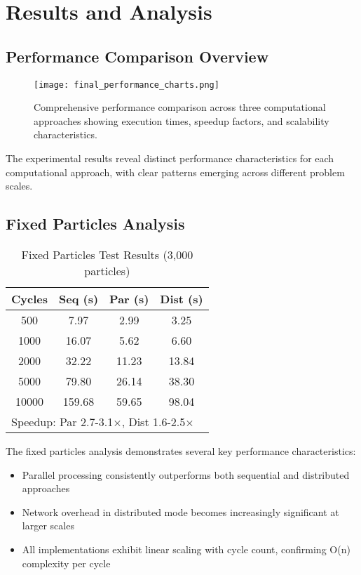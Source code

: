 \documentclass[sigconf]{acmart}
\begin{document}
\section{Results and Analysis}

\subsection{Performance Comparison Overview}

\begin{figure}[h]
\centering
\texttt{[image: final\_performance\_charts.png]}
\caption{Comprehensive performance comparison across three computational approaches showing execution times, speedup factors, and scalability characteristics.}
\label{fig:performance_charts}
\end{figure}

The experimental results reveal distinct performance characteristics for each computational approach, with clear patterns emerging across different problem scales.

\subsection{Fixed Particles Analysis}

\begin{table}[h]
\centering
\caption{Fixed Particles Test Results (3,000 particles)}
\label{tab:fixed_particles}
\footnotesize
\begin{tabular}{@{}cccc@{}}
\toprule
Cycles & Seq (s) & Par (s) & Dist (s) \\
\midrule
500 & 7.97 & 2.99 & 3.25 \\
1000 & 16.07 & 5.62 & 6.60 \\
2000 & 32.22 & 11.23 & 13.84 \\
5000 & 79.80 & 26.14 & 38.30 \\
10000 & 159.68 & 59.65 & 98.04 \\
\bottomrule
\multicolumn{4}{l}{\scriptsize Speedup: Par 2.7-3.1×, Dist 1.6-2.5×}
\end{tabular}
\end{table}

The fixed particles analysis demonstrates several key performance characteristics:
\begin{itemize}
    \item Parallel processing consistently outperforms both sequential and distributed approaches
    \item Network overhead in distributed mode becomes increasingly significant at larger scales
    \item All implementations exhibit linear scaling with cycle count, confirming O(n) complexity per cycle
\end{itemize}
\end{document}
